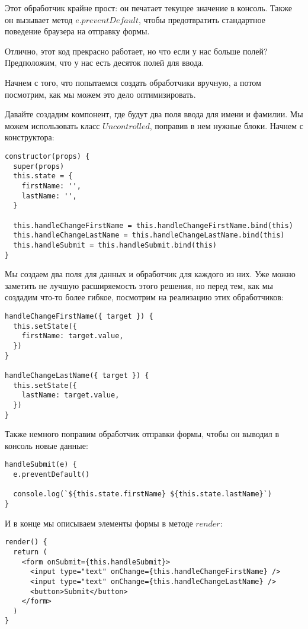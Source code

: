 Этот обработчик крайне прост: он печатает текущее значение в консоль. Также он вызывает метод $e.preventDefault$, чтобы предотвратить стандартное поведение браузера на отправку формы. 

Отлично, этот код прекрасно работает, но что если у нас больше полей? Предположим, что у нас есть десяток полей для ввода.

Начнем с того, что попытаемся создать обработчики вручную, а потом посмотрим, как мы можем это дело оптимизировать.

Давайте создадим компонент, где будут два поля ввода для имени и фамилии. Мы можем использовать класс $Uncontrolled$, поправив в нем нужные блоки. Начнем с конструктора:

\begin{lstlisting}
constructor(props) {
  super(props)
  this.state = {
    firstName: '',
    lastName: '',
  }
  
  this.handleChangeFirstName = this.handleChangeFirstName.bind(this)
  this.handleChangeLastName = this.handleChangeLastName.bind(this)
  this.handleSubmit = this.handleSubmit.bind(this)
}
\end{lstlisting}

Мы создаем два поля для данных и обработчик для каждого из них. Уже можно заметить не лучшую расширяемость этого решения, но перед тем, как мы создадим что-то более гибкое, посмотрим на реализацию этих обработчиков:

\begin{lstlisting}
handleChangeFirstName({ target }) {
  this.setState({
    firstName: target.value,
  })
}

handleChangeLastName({ target }) {
  this.setState({
    lastName: target.value,
  })
}
\end{lstlisting}

Также немного поправим обработчик отправки формы, чтобы он выводил в консоль новые данные:

\begin{lstlisting}
handleSubmit(e) {
  e.preventDefault()
  
  console.log(`${this.state.firstName} ${this.state.lastName}`)
}
\end{lstlisting}

И в конце мы описываем элементы формы в методе $render$:

\begin{lstlisting}
render() {
  return (
    <form onSubmit={this.handleSubmit}>
      <input type="text" onChange={this.handleChangeFirstName} />
      <input type="text" onChange={this.handleChangeLastName} />
      <button>Submit</button>
    </form> 
  )
}
\end{lstlisting}

